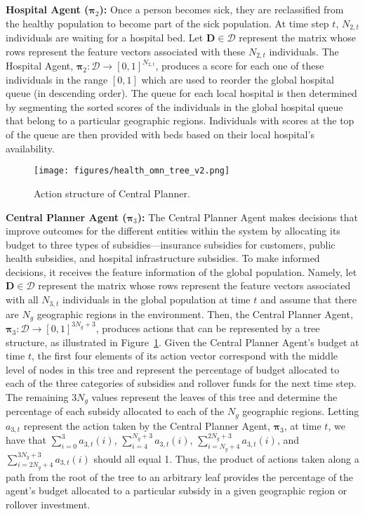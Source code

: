 \textbf{Hospital Agent ($\boldsymbol{\pi}_2$):} Once a person becomes sick, they are reclassified from the healthy population to become part of the sick population. At time step $t$, $N_{2,t}$ individuals are waiting for a hospital bed. Let $\mathbf{D}\in\mathcal{D}$ represent the matrix whose rows represent the feature vectors associated with these $N_{2,t}$ individuals. The Hospital Agent, $\boldsymbol{\pi}_2:\mathcal{D}\rightarrow[0,1]^{N_{2,t}}$, 
produces a score for each one of these individuals in the range $[0,1]$ which are used to reorder the global hospital queue (in descending order). The queue for each local hospital is then determined by segmenting the sorted scores of the individuals in the global hospital queue that belong to a particular geographic regions. Individuals with scores at the top of the queue are then provided with beds based on their local hospital's availability.

\begin{figure}[t!]
    \centering
    \texttt{[image: figures/health\_omn\_tree\_v2.png]}
    \caption{Action structure of Central Planner.} 
    \label{fig::health_omn_tree}
    \vspace{-0mm}
\end{figure}

\textbf{Central Planner Agent ($\boldsymbol{\pi}_3$):} The Central Planner Agent makes decisions that improve outcomes for the different entities within the system by allocating its budget to three types of subsidies---insurance subsidies for customers, public health subsidies, and hospital infrastructure subsidies. To make informed decisions, it receives the feature information of the global population. Namely, let $\mathbf{D}\in\mathcal{D}$ represent the matrix whose rows represent the feature vectors associated with all $N_{3,t}$ individuals in the global population at time $t$ and assume that there are $N_g$ geographic regions in the environment. Then, the Central Planner Agent, $\boldsymbol{\pi}_3:\mathcal{D}\rightarrow[0,1]^{3N_g+3}$, produces actions that can be represented by a tree structure, as illustrated in Figure~\ref{fig::health_omn_tree}. Given the Central Planner Agent's budget at time $t$, the first four elements of its action vector correspond with the middle level of nodes in this tree and represent the percentage of budget allocated to each of the three categories of subsidies and rollover funds for the next time step. The remaining $3N_g$ values represent the leaves of this tree and determine the percentage of each subsidy allocated to each of the $N_g$ geographic regions. Letting $a_{3,t}$ represent the action taken by the Central Planner Agent, $\boldsymbol{\pi}_3$, at time $t$, we have that $\sum_{i=0}^{3}a_{3,t}(i)$, $\sum_{i=4}^{N_g+3}a_{3,t}(i)$, $\sum_{i=N_g+4}^{2N_g+3}a_{3,t}(i)$, and $\sum_{i=2N_g+4}^{3N_g+3}a_{3,t}(i)$ should all equal 1. Thus, the product of actions taken along a path from the root of the tree to an arbitrary leaf provides the percentage of the agent's budget allocated to a particular subsidy in a given geographic region or rollover investment.

